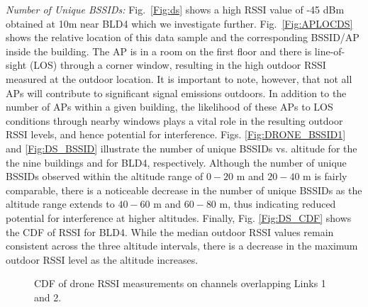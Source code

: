 \documentclass[sigconf,10pt]{acmart}
\begin{document}
{\it Number of Unique BSSIDs:} 
Fig.~\ref{Fig:ds} shows a high RSSI value of -45 dBm obtained at 10m near BLD4 which we investigate further. Fig.~\ref{Fig:APLOCDS} shows the relative location of this data sample and the corresponding BSSID/AP inside the building. The AP is in a room on the first floor and there is line-of-sight (LOS) through a corner window, resulting in the high outdoor RSSI measured at the outdoor location. It is important to note, however, that not all APs will contribute to significant signal emissions outdoors. In addition to the number of APs within a given building, the likelihood of these APs to LOS conditions through nearby windows plays a vital role in the resulting outdoor RSSI levels, and hence potential for interference. Figs. \ref{Fig:DRONE_BSSID1} and  \ref{Fig:DS_BSSID} illustrate the number of unique BSSIDs vs. altitude for the the nine buildings and for BLD4, respectively. Although the number of unique BSSIDs observed within the altitude range of $0-20$ m and $20-40$ m is fairly comparable, there is a noticeable decrease in the number of unique BSSIDs as the altitude range extends to $40-60$ m and $60-80$ m, thus indicating reduced potential for interference at higher altitudes. Finally, Fig. \ref{Fig:DS_CDF} shows the CDF of RSSI for BLD4. While the median outdoor RSSI values remain consistent across the three altitude intervals, there is a decrease in the maximum outdoor RSSI level as the altitude increases.

\begin{figure}
     \centering
     \begin{subfigure}[Link 1: RSSI on Channel 215.]{\centering
    \texttt{[image: Figures/cdf\_rssi\_drone\_link1.pdf]}
\label{Fig:link1}}
    \end{subfigure} \hspace{-7mm}
     \begin{subfigure}[Link 2: RSSI on Channel 55.]{
         \centering
         \texttt{[image: Figures/cdf\_rssi\_drone\_link2.pdf]}
\label{Fig:link2}}
     \end{subfigure}
      \vspace{-1em}
    \caption{CDF of drone RSSI measurements on channels overlapping Links 1 and 2.}
    \label{Fig:6ghz_fixed_link_perf}
     \vspace{-2em}
\end{figure}
\end{document}
